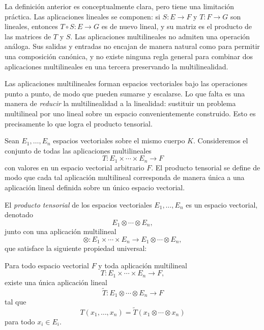 \medskip

La definición anterior es conceptualmente clara, pero tiene una limitación
práctica.
Las aplicaciones lineales se componen: si $S : E \to F$ y $T : F \to G$ son
lineales, entonces $T \circ S : E \to G$ es de nuevo lineal, y su matriz es
el producto de las matrices de $T$ y $S$.
Las aplicaciones multilineales no admiten una operación análoga.
Sus salidas y entradas no encajan de manera natural como para permitir una
composición canónica, y no existe ninguna regla general para combinar dos
aplicaciones multilineales en una tercera preservando la multilinealidad.

\medskip

Las aplicaciones multilineales forman espacios vectoriales bajo las operaciones
punto a punto, de modo que pueden sumarse y escalarse.
Lo que falta es una manera de \emph{reducir} la multilinealidad a la linealidad:
sustituir un problema multilineal por uno lineal sobre un espacio
convenientemente construido.
Esto es precisamente lo que logra el producto tensorial.

\medskip

Sean \(E_1,\dots,E_n\) espacios vectoriales sobre el mismo cuerpo \(K\).
Consideremos el conjunto de todas las aplicaciones multilineales
\[
T : E_1 \times \cdots \times E_n \longrightarrow F
\]
con valores en un espacio vectorial arbitrario \(F\).
El producto tensorial se define de modo que cada tal aplicación multilineal
corresponda de manera única a una aplicación lineal definida sobre un único
espacio vectorial.

\medskip

\begin{definition}
El \emph{producto tensorial} de los espacios vectoriales \(E_1,\dots,E_n\) es
un espacio vectorial, denotado
\[
E_1 \otimes \cdots \otimes E_n,
\]
junto con una aplicación multilineal
\[
\otimes : E_1 \times \cdots \times E_n \longrightarrow
E_1 \otimes \cdots \otimes E_n,
\]
que satisface la siguiente propiedad universal:

Para todo espacio vectorial \(F\) y toda aplicación multilineal
\[
T : E_1 \times \cdots \times E_n \longrightarrow F,
\]
existe una única aplicación lineal
\[
\widetilde{T} : E_1 \otimes \cdots \otimes E_n \longrightarrow F
\]
tal que
\[
T(x_1,\dots,x_n) = \widetilde{T}(x_1 \otimes \cdots \otimes x_n)
\]
para todo \(x_i \in E_i\).
\end{definition}

\medskip

